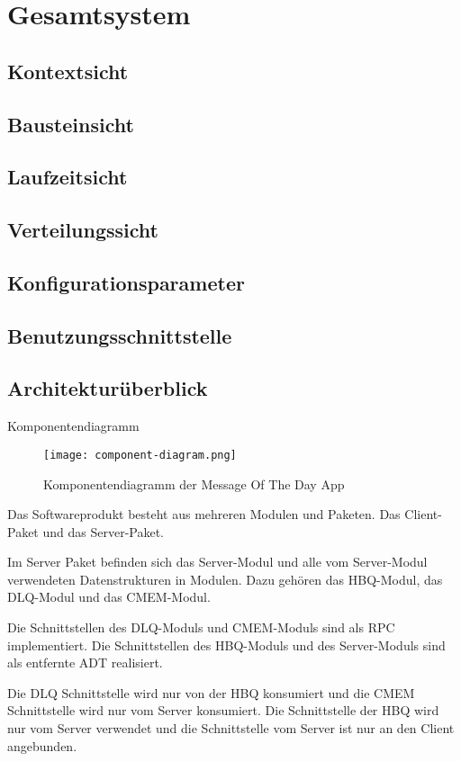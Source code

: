 \documentclass{article}
\begin{document}
\newpage

\section{Gesamtsystem}
\subsection{Kontextsicht}
\subsection{Bausteinsicht}
\subsection{Laufzeitsicht}
\subsection{Verteilungssicht}
\subsection{Konfigurationsparameter}
\subsection{Benutzungsschnittstelle}


	\subsection{Architekturüberblick}
	Komponentendiagramm
	\begin{figure}[H]
	\centering
		\texttt{[image: component-diagram.png]}
	\caption[seq-dia]{Komponentendiagramm der Message Of The Day App}
	\label{fig:component-diagram}
	\end{figure}

	Das Softwareprodukt besteht aus mehreren Modulen und Paketen. Das Client-Paket und das Server-Paket.

	Im Server Paket befinden sich das Server-Modul und alle vom Server-Modul verwendeten Datenstrukturen in Modulen.
	Dazu gehören das HBQ-Modul, das DLQ-Modul und das CMEM-Modul.

	Die Schnittstellen des DLQ-Moduls und CMEM-Moduls sind als RPC implementiert. Die Schnittstellen des HBQ-Moduls und des
	Server-Moduls sind als entfernte ADT realisiert.

	Die DLQ Schnittstelle wird nur von der HBQ konsumiert und die CMEM Schnittstelle wird nur vom Server konsumiert.
	Die Schnittstelle der HBQ wird nur vom Server verwendet und die Schnittstelle vom Server ist nur an den Client angebunden.
\end{document}
